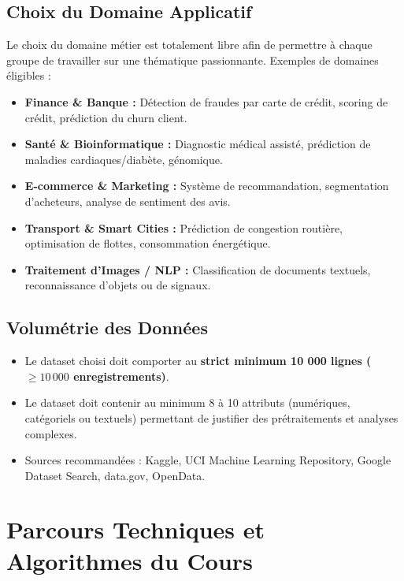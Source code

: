 \documentclass[11pt,a4paper]{article}
\begin{document}
\subsection{Choix du Domaine Applicatif}
Le choix du domaine métier est totalement libre afin de permettre à chaque groupe de travailler sur une thématique passionnante. Exemples de domaines éligibles :
\begin{itemize}
    \item \textbf{Finance \& Banque :} Détection de fraudes par carte de crédit, scoring de crédit, prédiction du churn client.
    \item \textbf{Santé \& Bioinformatique :} Diagnostic médical assisté, prédiction de maladies cardiaques/diabète, génomique.
    \item \textbf{E-commerce \& Marketing :} Système de recommandation, segmentation d'acheteurs, analyse de sentiment des avis.
    \item \textbf{Transport \& Smart Cities :} Prédiction de congestion routière, optimisation de flottes, consommation énergétique.
    \item \textbf{Traitement d'Images / NLP :} Classification de documents textuels, reconnaissance d'objets ou de signaux.
\end{itemize}

\subsection{Volumétrie des Données}
\begin{itemize}
    \item Le dataset choisi doit comporter au \textbf{strict minimum 10 000 lignes ($\ge 10\,000$ enregistrements)}.
    \item Le dataset doit contenir au minimum 8 à 10 attributs (numériques, catégoriels ou textuels) permettant de justifier des prétraitements et analyses complexes.
    \item Sources recommandées : Kaggle, UCI Machine Learning Repository, Google Dataset Search, data.gov, OpenData.
\end{itemize}

\section{Parcours Techniques et Algorithmes du Cours}
\end{document}
